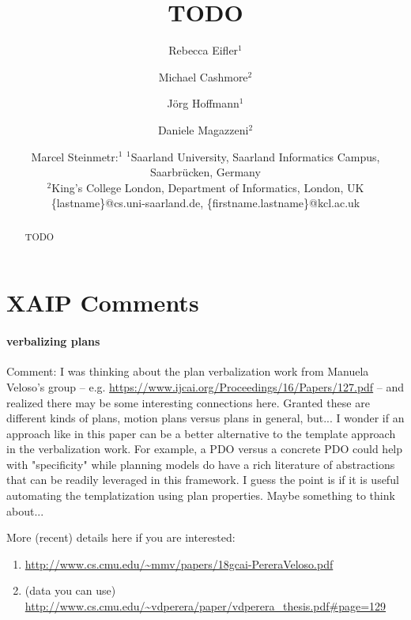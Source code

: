 \documentclass[letterpaper]{article} %
\begin{document}
%
\title{TODO}
\author{
	Rebecca Eifler$^1$\and
	Michael Cashmore$^2$\and
	J\"org Hoffmann$^1$\and
	Daniele Magazzeni$^2$\and
	Marcel Steinmetr:$^1$
	$^1$Saarland University, Saarland Informatics Campus, Saarbr\"ucken, Germany\\
	$^2$King's College London, Department of Informatics, London, UK\\
	\{lastname\}@cs.uni-saarland.de,
	\{firstname.lastname\}@kcl.ac.uk 
}

\maketitle
\begin{abstract}
	TODO
\end{abstract}

\section{XAIP Comments}

\paragraph{verbalizing plans}

	Comment: I was thinking about the plan verbalization work from Manuela Veloso's group 
	-- e.g. \url{https://www.ijcai.org/Proceedings/16/Papers/127.pdf} 
	-- and realized there may be some interesting connections here. 
	Granted these are different kinds of plans, motion plans versus plans in general, 
	but...  I wonder if an approach like in this paper can be a better alternative 
	to the template approach in the verbalization work. For example, a PDO versus 
	a concrete PDO could help with "specificity" while planning models do have 
	a rich literature of abstractions that can be readily leveraged in this framework. 
	I guess the point is if it is useful automating the templatization using plan properties. 
	Maybe something to think about... 

	More (recent) details here if you are interested:
	\begin{enumerate}
		\item \url{http://www.cs.cmu.edu/~mmv/papers/18gcai-PereraVeloso.pdf}
		\item (data you can use) \url{http://www.cs.cmu.edu/~vdperera/paper/vdperera_thesis.pdf#page=129}
	\end{enumerate}
\end{document}
